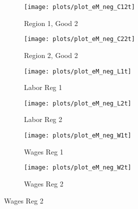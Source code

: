 \documentclass[../thesis.tex]{subfiles}
\begin{document}
\begin{figure}[h!]
	\centering
	\caption*{Negative-Monetary-Shock Impulse Response Functions, part 2}
	\begin{subfigure}[b]{0.27\textwidth}
		\centering
		\texttt{[image: plots/plot\_eM\_neg\_C12t]}
		\caption{\scriptsize Region 1, Good 2}
		\label{fig:eM-neg-C12t}
	\end{subfigure}
	\hspace*{0.5cm}
	\begin{subfigure}[b]{0.27\textwidth}
		\centering
		\texttt{[image: plots/plot\_eM\_neg\_C22t]}
		\caption{\scriptsize Region 2, Good 2}
		\label{fig:eM-neg-C22t}
	\end{subfigure}
	\hspace*{0.5cm}
	\begin{subfigure}[b]{0.27\textwidth}
		\centering
		\texttt{[image: plots/plot\_eM\_neg\_L1t]}
		\caption{\scriptsize Labor Reg 1}
		\label{fig:eM-neg-L1t}
	\end{subfigure}
	\vspace*{0.1cm}
	\begin{subfigure}[b]{0.27\textwidth}
		\centering
		\texttt{[image: plots/plot\_eM\_neg\_L2t]}
		\caption{\scriptsize Labor Reg 2}
		\label{fig:eM-neg-L2t}
	\end{subfigure}
	\hspace*{0.5cm}
	\begin{subfigure}[b]{0.27\textwidth}
		\centering
		\texttt{[image: plots/plot\_eM\_neg\_W1t]}
		\caption{\scriptsize Wages Reg 1}
		\label{fig:eM-neg-W1t}
	\end{subfigure}
	\hspace*{0.5cm}
	\begin{subfigure}[b]{0.27\textwidth}
		\centering
		\texttt{[image: plots/plot\_eM\_neg\_W2t]}
		\caption{\scriptsize Wages Reg 2}
		\label{fig:eM-neg-W2t}
	\end{subfigure}
	\vspace*{0.1cm}

\end{figure}
\end{document}
